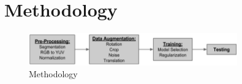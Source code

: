 \documentclass[conference]{IEEEtran}
\begin{document}
%
%


%




\section{Methodology}
\begin{figure}[h]
\includegraphics[width=9cm]{methodology}
\caption{Methodology}
\end{figure}
\end{document}
